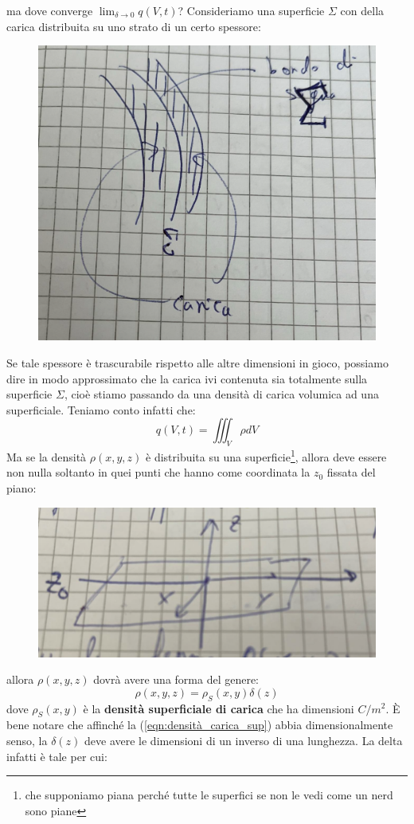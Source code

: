 \documentclass{book}
\begin{document}
        ma dove converge $\displaystyle \lim_{\delta \to 0} q(V,t)$? Consideriamo una superficie $\Sigma$ con della carica distribuita su uno strato di un certo spessore:
        \begin{figure}[h!]
            \centering
            \includegraphics[width=0.5\linewidth]{img//Chapter_one/chapt1img6.png}
            \caption{}
        \end{figure}
        Se tale spessore è trascurabile rispetto alle altre dimensioni in gioco, possiamo dire in modo approssimato che la carica ivi contenuta sia totalmente sulla superficie $\Sigma$, cioè stiamo passando da una densità di carica volumica ad una superficiale. Teniamo conto infatti che:
        \begin{equation}
            q(V,t) = \iiint_{V} \rho dV
        \end{equation}
        Ma se la densità $\rho(x,y,z)$ è distribuita su una superficie\footnote{che supponiamo piana perché tutte le superfici se non le vedi come un nerd sono piane}, allora deve essere non nulla soltanto in quei punti che hanno come coordinata la $z_{0}$ fissata del piano:
        \begin{figure}[h!]
            \centering
            \includegraphics[width=0.36\linewidth]{img/Chapter_one/chapt1img7.png}
            \caption{}
        \end{figure}
        \newpage
        allora $\rho(x,y,z)$ dovrà avere una forma del genere:
        \begin{equation}
        \label{eqn:densità_carica_sup}
            \rho (x,y,z) = \rho_{S}(x,y)\delta(z)
        \end{equation}
        dove $\rho_{S}(x,y)$ è la \textbf{densità superficiale di carica} che ha dimensioni $C/m^{2}$. È bene notare che affinché la (\ref{eqn:densità_carica_sup}) abbia dimensionalmente senso, la $\delta(z)$ deve avere le dimensioni di un inverso di una lunghezza. La delta infatti è tale per cui:
\end{document}
